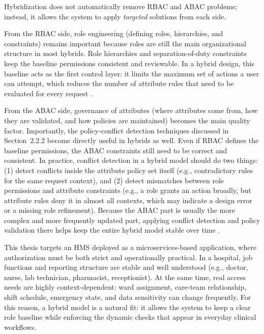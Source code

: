 Hybridization does not automatically remove RBAC and ABAC problems; instead, it allows the system to apply \emph{targeted} solutions from each side.
\vspace{0.5cm}


From the RBAC side, role engineering (defining roles, hierarchies, and constraints) remains important because roles are still the main organizational structure in most hybrids. Role hierarchies and separation-of-duty constraints keep the baseline permissions consistent and reviewable. In a hybrid design, this baseline acts as the first control layer: it limits the maximum set of actions a user can attempt, which reduces the number of attribute rules that need to be evaluated for every request \cite{KuhnCoyneWeil2010}.
\vspace{0.5cm}


From the ABAC side, governance of attributes (where attributes come from, how they are validated, and how policies are maintained) becomes the main quality factor. Importantly, the policy-conflict detection techniques discussed in Section~2.2.2 become directly useful in hybrids as well. Even if RBAC defines the baseline permissions, the ABAC constraints still need to be correct and consistent. In practice, conflict detection in a hybrid model should do two things: (1) detect conflicts inside the attribute policy set itself (e.g., contradictory rules for the same request context), and (2) detect mismatches between role permissions and attribute constraints (e.g., a role grants an action broadly, but attribute rules deny it in almost all contexts, which may indicate a design error or a missing role refinement). Because the ABAC part is usually the more complex and more frequently updated part, applying conflict detection and policy validation there helps keep the entire hybrid model stable over time \cite{Houhou2024HyARBAC}.
\vspace{0.5cm}


This thesis targets an HMS deployed as a microservices-based application, where authorization must be both strict and operationally practical. In a hospital, job functions and reporting structure are stable and well understood (e.g., doctor, nurse, lab technician, pharmacist, receptionist). At the same time, real access needs are highly context-dependent: ward assignment, care-team relationship, shift schedule, emergency state, and data sensitivity can change frequently. For this reason, a hybrid model is a natural fit: it allows the system to keep a clear role baseline while enforcing the dynamic checks that appear in everyday clinical workflows.
\vspace{0.5cm}


